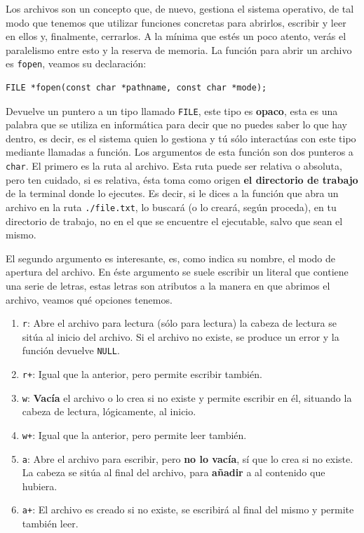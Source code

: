 \documentclass[a4paper]{article}
\begin{document}
Los archivos son un concepto que, de nuevo, gestiona el sistema operativo,
de tal modo que tenemos que utilizar funciones concretas para abrirlos, escribir
y leer en ellos y, finalmente, cerrarlos. A la mínima que estés un poco atento,
verás el paralelismo entre esto y la reserva de memoria. La función para abrir
un archivo es \lstinline[style=C]!fopen!, veamos su declaración:

\noindent
\begin{minipage}[H]{\linewidth}
\mbox{}
\begin{lstlisting}[style=C,
caption={Declaración de la función \texttt{fopen}},
label={lst:callocSignature}]
FILE *fopen(const char *pathname, const char *mode);
\end{lstlisting}
\end{minipage}

Devuelve un puntero a un tipo llamado \verb!FILE!, este tipo es \textbf{opaco},
esta es una palabra que se utiliza en informática para decir que no puedes saber
lo que hay dentro, es decir, es el sistema quien lo gestiona y tú sólo
interactúas con este tipo mediante llamadas a función. Los argumentos de esta
función son dos punteros a \verb!char!. El primero es la ruta al archivo.
Esta ruta puede ser relativa o absoluta, pero ten cuidado, si es relativa, ésta
toma como origen \textbf{el directorio de trabajo} de la terminal donde lo
ejecutes. Es decir, si le dices a la función que abra un archivo en la ruta
\verb!./file.txt!, lo buscará (o lo creará, según proceda), en tu directorio
de trabajo, no en el que se encuentre el ejecutable, salvo que sean el mismo.

El segundo argumento es interesante, es, como indica su nombre, el modo de
apertura del archivo. En éste argumento se suele escribir un literal que
contiene una serie de letras, estas letras son atributos a la manera en que
abrimos el archivo, veamos qué opciones tenemos.
\begin{enumerate}
\item \verb!r!: Abre el archivo para lectura (sólo para lectura) la cabeza
de lectura se sitúa al inicio del archivo. Si el archivo no existe, se produce
un error y la función devuelve \verb!NULL!.
\item \verb!r+!: Igual que la anterior, pero permite escribir también.
\item \verb!w!: \textbf{Vacía} el archivo o lo crea si no existe
y permite escribir en él, situando la cabeza de lectura, lógicamente, al inicio.
\item \verb!w+!: Igual que la anterior, pero permite leer también.
\item \verb!a!: Abre el archivo para escribir, pero \textbf{no lo vacía},
sí que lo crea si no existe. La cabeza se sitúa al final del archivo, para
\textbf{añadir} a al contenido que hubiera.
\item \verb!a+!: El archivo es creado si no existe, se escribirá al final
del mismo y permite también leer.
\end{enumerate}
\end{document}
